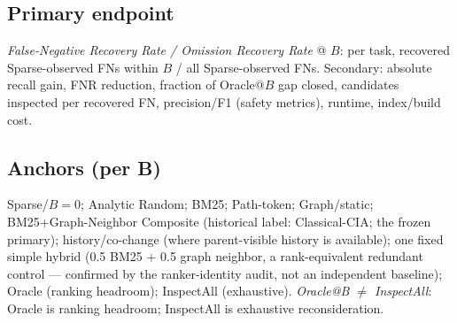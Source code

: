 \documentclass[11pt,a4paper]{article}
\begin{document}
\subsection{Primary endpoint}
\emph{False-Negative Recovery Rate / Omission Recovery Rate} @ $B$: per task,
recovered Sparse-observed FNs within $B$ / all Sparse-observed FNs. Secondary:
absolute recall gain, FNR reduction, fraction of Oracle@$B$ gap closed,
candidates inspected per recovered FN, precision/F1 (safety metrics), runtime,
index/build cost.

\subsection{Anchors (per B)}
Sparse/$B{=}0$; Analytic Random; BM25; Path-token; Graph/static;
BM25+Graph-Neighbor Composite (historical label: Classical-CIA; the frozen
primary); history/co-change (where parent-visible history is available); one
fixed simple hybrid (0.5 BM25 + 0.5 graph neighbor, a rank-equivalent
redundant control --- confirmed by the ranker-identity audit, not an
independent baseline); Oracle (ranking headroom); InspectAll (exhaustive).
\emph{Oracle@B $\neq$ InspectAll}: Oracle is ranking headroom;
InspectAll is exhaustive reconsideration.
\end{document}
